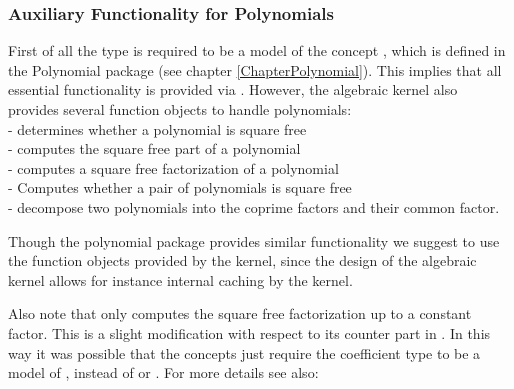 
\subsubsection{Auxiliary Functionality for Polynomials}

First of all the type  is required
to be a model of the concept , which is defined
in the Polynomial package (see chapter \ref{ChapterPolynomial}).
This implies that all essential functionality is provided via
. However, the algebraic kernel also
provides several function objects to handle polynomials:\\
- determines whether a polynomial is square free \\
- computes the square free part of a polynomial \\
- computes a square free factorization of a polynomial \\
- Computes whether a pair of polynomials is square free\\
- decompose two polynomials into the coprime factors and their common factor. 

Though the polynomial package provides similar functionality we suggest to use 
the function objects provided by the kernel, since the design of the algebraic kernel 
allows for instance internal caching by the kernel. 


Also note that   only computes the square free 
factorization up to a constant factor. This is a slight modification with respect to its 
counter part in . In this way it was possible that the concepts just require 
the coefficient type to be a model of , instead of  or . 
For more details see also:\\
 \\
\\


